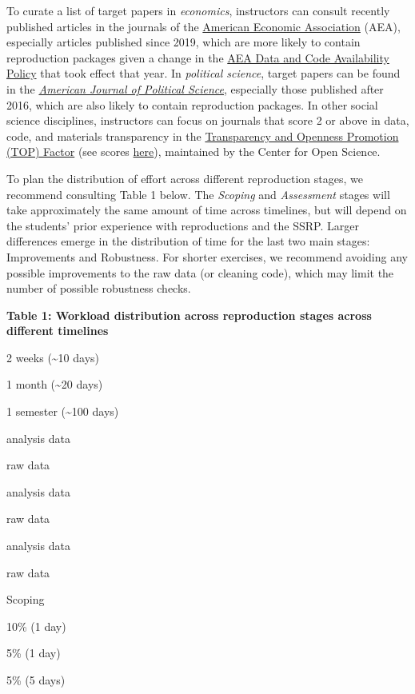 \documentclass[
]{book}
\begin{document}
To curate a list of target papers in \emph{economics}, instructors can consult recently published articles in the journals of the \href{https://www.aeaweb.org/journals}{American Economic Association} (AEA), especially articles published since 2019, which are more likely to contain reproduction packages given a change in the \href{https://www.aeaweb.org/journals/data/data-code-policy}{AEA Data and Code Availability Policy} that took effect that year. In \emph{political science}, target papers can be found in the \emph{\href{https://ajps.org/ajps-verification-policy/}{American Journal of Political Science}}, especially those published after 2016, which are also likely to contain reproduction packages. In other social science disciplines, instructors can focus on journals that score 2 or above in data, code, and materials transparency in the \href{https://www.cos.io/initiatives/top-guidelines}{Transparency and Openness Promotion (TOP) Factor} (see scores \href{https://topfactor.org/}{here}), maintained by the Center for Open Science.

To plan the distribution of effort across different reproduction stages, we recommend consulting Table 1 below. The \emph{Scoping} and \emph{Assessment} stages will take approximately the same amount of time across timelines, but will depend on the students' prior experience with reproductions and the SSRP. Larger differences emerge in the distribution of time for the last two main stages: Improvements and Robustness. For shorter exercises, we recommend avoiding any possible improvements to the raw data (or cleaning code), which may limit the number of possible robustness checks.

\textbf{Table 1: Workload distribution across reproduction stages across different timelines}

2 weeks (\textasciitilde10 days)

1 month (\textasciitilde20 days)

1 semester (\textasciitilde100 days)

analysis data

raw data

analysis data

raw data

analysis data

raw data

Scoping

10\% (1 day)

5\% (1 day)

5\% (5 days)
\end{document}
